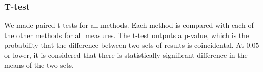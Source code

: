 \subsubsection{T-test}\label{sec:ttest}
We made paired t-tests for all methods. Each method is compared with each of the other methods for all measures. The t-test outputs a p-value, which is the probability that the difference between two sets of results is coincidental. At $0.05$ or lower, it is considered that there is statistically significant difference in the means of the two sets.